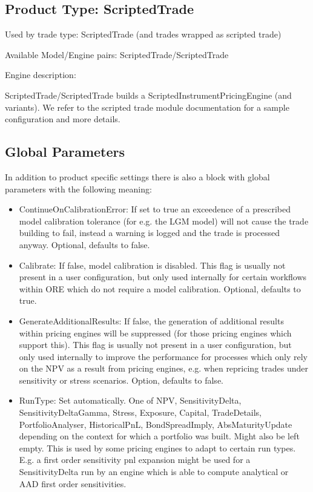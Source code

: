 \subsection{Product Type: ScriptedTrade}

Used by trade type: ScriptedTrade (and trades wrapped as scripted trade)

Available Model/Engine pairs: ScriptedTrade/ScriptedTrade

Engine description:

ScriptedTrade/ScriptedTrade builds a ScriptedInstrumentPricingEngine (and variants). We refer to the scripted trade
module documentation for a sample configuration and more details.

\subsection{Global Parameters}

In addition to product specific settings there is also a block with global parameters with the following meaning:

\begin{itemize}
\item ContinueOnCalibrationError: If set to true an exceedence of a prescribed model calibration tolerance (for e.g. the
  LGM model) will not cause the trade building to fail, instead a warning is logged and the trade is processed
  anyway. Optional, defaults to false.
\item Calibrate: If false, model calibration is disabled. This flag is usually not present in a user configuration, but
  only used internally for certain workflows within ORE which do not require a model calibration. Optional, defaults to
  true.
\item GenerateAdditionalResults: If false, the generation of additional results within pricing engines will be
  suppressed (for those pricing engines which support this). This flag is usually not present in a user configuration,
  but only used internally to improve the performance for processes which only rely on the NPV as a result from pricing
  engines, e.g. when repricing trades under sensitivity or stress scenarios. Option, defaults to false.
\item RunType: Set automatically. One of NPV, SensitivityDelta, SensitivityDeltaGamma, Stress, Exposure, Capital,
  TradeDetails, PortfolioAnalyser, HistoricalPnL, BondSpreadImply, AbsMaturityUpdate depending on the context for which
  a portfolio was built. Might also be left empty. This is used by some pricing engines to adapt to certain run
  types. E.g. a first order sensitivity pnl expansion might be used for a SensitivityDelta run by an engine which is
  able to compute analytical or AAD first order sensitivities.
\end{itemize}
